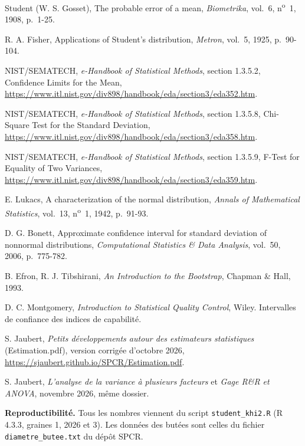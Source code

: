 \documentclass[11pt,a4paper]{article}
\theoremstyle{sj}
\theoremstyle{definition}
\theoremstyle{remark}
\providecommand{\og}{\guillemotleft\nobreakspace}
\providecommand{\fg}{\nobreakspace\guillemotright}
\begin{document}
\begin{enumerate}[label={[\arabic*]},leftmargin=2.2em,itemsep=3pt]
\item Student (W. S. Gosset), \og The probable error of a mean\fg{}, \emph{Biometrika}, vol.~6, n\textsuperscript{o}~1, 1908, p.~1-25.
\item R. A. Fisher, \og Applications of \og Student's\fg{} distribution\fg{}, \emph{Metron}, vol.~5, 1925, p.~90-104.
\item NIST/SEMATECH, \emph{e-Handbook of Statistical Methods}, section 1.3.5.2, \og Confidence Limits for the Mean\fg{}, \url{https://www.itl.nist.gov/div898/handbook/eda/section3/eda352.htm}.
\item NIST/SEMATECH, \emph{e-Handbook of Statistical Methods}, section 1.3.5.8, \og Chi-Square Test for the Standard Deviation\fg{}, \url{https://www.itl.nist.gov/div898/handbook/eda/section3/eda358.htm}.
\item NIST/SEMATECH, \emph{e-Handbook of Statistical Methods}, section 1.3.5.9, \og F-Test for Equality of Two Variances\fg{}, \url{https://www.itl.nist.gov/div898/handbook/eda/section3/eda359.htm}.
\item E. Lukacs, \og A characterization of the normal distribution\fg{}, \emph{Annals of Mathematical Statistics}, vol.~13, n\textsuperscript{o}~1, 1942, p.~91-93.
\item D. G. Bonett, \og Approximate confidence interval for standard deviation of nonnormal distributions\fg{}, \emph{Computational Statistics \& Data Analysis}, vol.~50, 2006, p.~775-782.
\item B. Efron, R. J. Tibshirani, \emph{An Introduction to the Bootstrap}, Chapman \& Hall, 1993.
\item D. C. Montgomery, \emph{Introduction to Statistical Quality Control}, Wiley. Intervalles de confiance des indices de capabilité.
\item S. Jaubert, \emph{Petits développements autour des estimateurs statistiques} (Estimation.pdf), version corrigée d'octobre 2026, \url{https://sjaubert.github.io/SPCR/Estimation.pdf}.
\item S. Jaubert, \emph{L'analyse de la variance à plusieurs facteurs} et \emph{Gage R\&R et ANOVA}, novembre 2026, même dossier.
\end{enumerate}

\textbf{Reproductibilité.} Tous les nombres viennent du script \texttt{student\_khi2.R} (R 4.3.3, graines 1, 2026 et 3). Les données des butées sont celles du fichier \texttt{diametre\_butee.txt} du dépôt SPCR.
\end{document}
